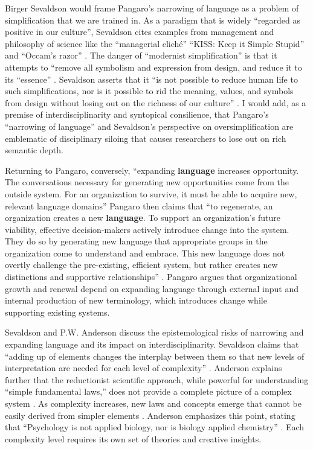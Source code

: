Birger Sevaldson would frame Pangaro’s narrowing of language as a problem of simplification that we are trained in. As a paradigm that is widely ``regarded as positive in our culture”, Sevaldson cites examples from management and philosophy of science like the ``managerial cliché” ``KISS: Keep it Simple Stupid” and ``Occam’s razor” \citep[p. 98]{sevaldson_designing_2022}. The danger of “modernist simplification” is that it attempts to ``remove all symbolism and expression from design, and reduce it to its ``essence” \citep[p. 98]{sevaldson_designing_2022}. Sevaldson asserts that it ``is not possible to reduce human life to such simplifications, nor is it possible to rid the meaning, values, and symbols from design without losing out on the richness of our culture” \citep[p. 98]{sevaldson_designing_2022}. I would add, as a premise of interdisciplinarity and syntopical consilience, that Pangaro’s ``narrowing of language” and Sevaldson’s perspective on oversimplification are emblematic of disciplinary siloing that causes researchers to lose out on rich semantic depth.

Returning to Pangaro, conversely, ``expanding \textbf{language} increases opportunity. The conversations necessary for generating new opportunities come from the outside system. For an organization to survive, it must be able to acquire new, relevant language domains” \citep[p. 147]{pangaro_design_2011} Pangaro then claims that ``to regenerate, an organization creates a new \textbf{language}. To support an organization’s future viability, effective decision-makers actively introduce change into the system. They do so by generating new language that appropriate groups in the organization come to understand and embrace. This new language does not overtly challenge the pre-existing, efficient system, but rather creates new distinctions and supportive relationships” \citep[p. 148]{pangaro_design_2011}. Pangaro argues that organizational growth and renewal depend on expanding language through external input and internal production of new terminology, which introduces change while supporting existing systems.

Sevaldson and P.W. Anderson discuss the epistemological risks of narrowing and expanding language and its impact on interdisciplinarity. Sevaldson claims that “adding up of elements changes the interplay between them so that new levels of interpretation are needed for each level of complexity” \citep[p. 99]{sevaldson_designing_2022}. Anderson explains further that the reductionist scientific approach, while powerful for understanding ``simple fundamental laws,” does not provide a complete picture of a complex system \citep[p. 393]{anderson_more_1972}. As complexity increases, new laws and concepts emerge that cannot be easily derived from simpler elements \citep[p. 393]{anderson_more_1972}. Anderson emphasizes this point, stating that ``Psychology is not applied biology, nor is biology applied chemistry” \citep[p. 393]{anderson_more_1972}. Each complexity level requires its own set of theories and creative insights. 

